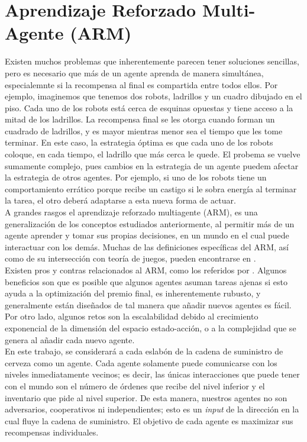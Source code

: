 \section{Aprendizaje Reforzado Multi-Agente (ARM)}

Existen muchos problemas que inherentemente parecen tener soluciones sencillas, pero es necesario que m\'as de un agente aprenda de manera simult\'anea, especialemnte si la recompensa al final es compartida entre todos ellos. Por ejemplo, imaginemos que tenemos dos robots, ladrillos y un cuadro dibujado en el piso. Cada uno de los robots est\'a cerca de esquinas opuestas y tiene acceso a la mitad de los ladrillos. La recompensa final se les otorga cuando forman un cuadrado de ladrillos, y es mayor mientras menor sea el tiempo que les tome terminar. En este caso, la estrategia \'optima es que cada uno de los robots coloque, en cada tiempo, el ladrillo que m\'as cerca le quede. El probema se vuelve sumamente complejo, pues cambios en la estrategia de un agente puedem afectar la estrategia de otros agentes. Por ejemplo, si uno de los robots tiene un comportamiento err\'atico porque recibe un castigo si le sobra energ\'ia al terminar la tarea, el otro deber\'a adaptarse a esta nueva forma de actuar.\\

A grandes rasgos el aprendizaje reforzado multiagente (ARM), es una generalizaci\'on de los conceptos estudiados anteriormente, al permitir m\'as de un agente aprender y tomar sus propias decisiones, en un mundo en el cual puede interactuar con los dem\'as. Muchas de las definiciones espec\'ificas del ARM, as\'i como de su intersecci\'on con teor\'ia de juegos, pueden encontrarse en \citet{Bloembergen}. \\

Existen pros y contras relacionados al ARM, como los referidos por \citet{Busoniu}. Algunos beneficios son que es posible que algunos agentes asuman tareas ajenas si esto ayuda a la optimizaci\'on del premio final, es inherentemente rubusto, y generalmente est\'an dise\~nados de tal manera que a\~nadir nuevos agentes es f\'acil. Por otro lado, algunos retos son la escalabilidad debido al crecimiento exponencial de la dimensi\'on del espacio estado-acci\'on, o a la complejidad que se genera al a\~nadir cada nuevo agente.\\

En este trabajo, se considerar\'a a cada eslab\'on de la cadena de suministro de cerveza como un agente. Cada agente solamente puede comunicarse con los niveles inmediatamente vecinos; es decir, las \'unicas interacciones que puede tener con el mundo son el n\'umero de \'ordenes que recibe del nivel inferior y el inventario que pide al nivel superior. De esta manera, nuestros agentes no son adversarios, cooperativos ni independientes; esto es un \textit{input} de la direcci\'on en la cual fluye la cadena de suministro. El objetivo de cada agente es maximizar sus recompensas individuales.\\

